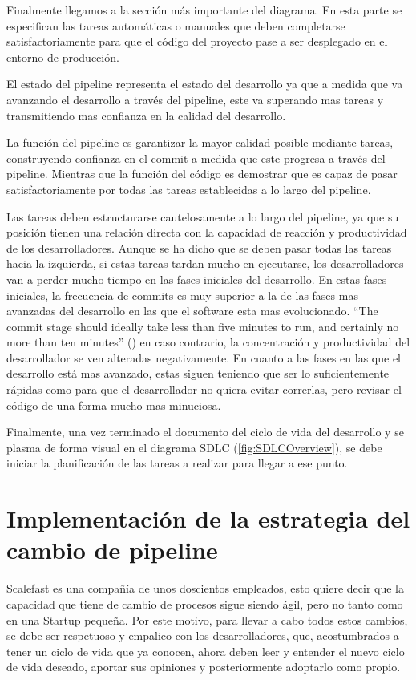 \documentclass[12pt]{report} %
\begin{document}
Finalmente llegamos a la sección más importante del diagrama.  En esta parte se
especifican las tareas automáticas o manuales que deben completarse
satisfactoriamente para que el código del proyecto pase a ser desplegado en el
entorno de producción.  

El estado del \gls{pipeline} representa el estado del desarrollo ya que a medida
que va avanzando el desarrollo a través del \gls{pipeline}, este va superando
mas tareas y transmitiendo mas confianza en la calidad del desarrollo.

La función del pipeline es 
garantizar la mayor calidad posible mediante tareas, construyendo confianza en
el \gls{commit} a medida que este progresa a través del \gls{pipeline}.
Mientras que la función del código es demostrar que es
capaz de pasar satisfactoriamente por todas las tareas establecidas a lo
largo del \gls{pipeline}.
 
Las tareas deben estructurarse cautelosamente a lo largo del \gls{pipeline}, ya que su posición tienen una relación directa
con la capacidad de reacción y productividad de los desarrolladores.
Aunque se ha dicho que se deben pasar todas las tareas hacia la izquierda, si
estas tareas tardan mucho en ejecutarse, los desarrolladores van a perder mucho
tiempo en las fases iniciales del desarrollo.
En estas fases iniciales, la frecuencia de commits es muy superior a la de las
fases mas avanzadas del desarrollo en las que el software esta mas evolucionado.
``The commit stage should ideally take less than five minutes to run, and
certainly no more than ten minutes'' (\cite{Humble2010}) en caso contrario, la concentración y productividad del
desarrollador se ven alteradas negativamente.
En cuanto a las fases en las que el desarrollo está mas avanzado, estas siguen
teniendo que ser lo suficientemente rápidas como para que el desarrollador no
quiera evitar correrlas, pero revisar el código de una forma mucho mas minuciosa.

Finalmente, una vez terminado el documento del ciclo de vida del desarrollo y se
plasma de forma visual en el diagrama \gls{SDLC} (\ref{fig:SDLCOverview}), se
debe iniciar la planificación de las tareas a realizar para llegar a ese punto.

\section{Implementación de la estrategia del cambio de pipeline}

Scalefast es una compañía de unos doscientos empleados, esto quiere decir que la
capacidad que tiene de cambio de procesos sigue siendo ágil, pero no tanto como
en una Startup pequeña.
Por este motivo, para llevar a cabo todos estos cambios, se debe ser respetuoso
y empalico con los desarrolladores, que, acostumbrados a tener un ciclo de vida
que ya conocen, ahora deben leer y entender el nuevo ciclo de vida deseado,
aportar sus opiniones y posteriormente adoptarlo como propio.
\end{document}
